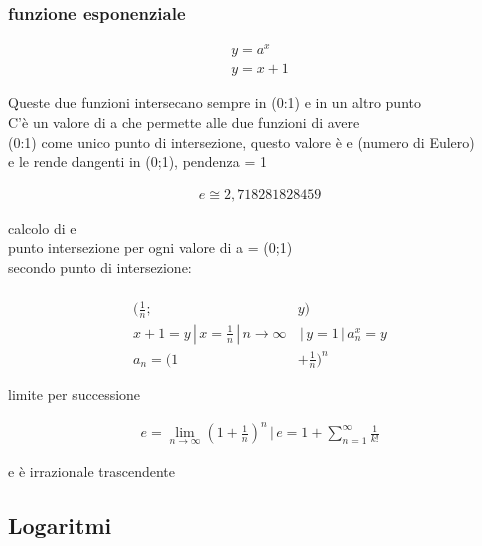 \documentclass{article}
\begin{document}
\subsubsection{funzione esponenziale}
\begin{align*}
    y=a^x
    \\y=x+1
\end{align*}
\begin{center}
    Queste due funzioni intersecano sempre in (0:1) e in un altro punto
    \\ C'è un valore di a che permette alle due funzioni di avere 
    \\ (0:1) come unico punto di intersezione, questo valore è e (numero di Eulero)
    \\ e le rende dangenti in (0;1), pendenza = 1
\end{center}
\begin{align*}
    e\cong 2,718281828459
\end{align*}
\begin{center}
    calcolo di e
    \\punto intersezione per ogni valore di a = (0;1)
    \\secondo punto di intersezione:
\end{center}
\begin{align*}
        \\ (\frac{1}{n};&y)
        \\ x + 1 = y \,|\, x = \frac{1}{n} \,|\, n \rightarrow \infty & \,|\, y = 1 \,|\, a_n^x = y  
        \\ a_n = (1 & + \frac{1}{n})^n
\end{align*}
\begin{center}
    limite per successione 
\end{center}
\begin{align*}
    e = \lim_{n \to \infty} (1 + \frac{1}{n})^n \,|\, e = 1 + \sum_{n = 1}^{\infty} 
      \frac{1}{k!} 
\end{align*}
\begin{center}
    e è irrazionale trascendente


\end{center}

\subsection{Logaritmi}
\end{document}
